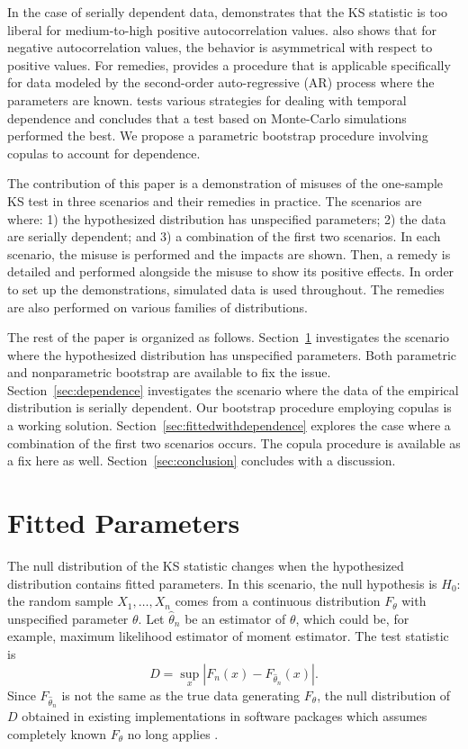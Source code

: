 \documentclass[12pt, letterpaper, titlepage]{article}
\begin{document}
In the case of serially dependent data, \citet{Durilleul} demonstrates that the 
KS statistic is too liberal for medium-to-high positive autocorrelation values. 
\citet{Durilleul} also shows that for negative autocorrelation values, the 
behavior is asymmetrical with respect to positive values. For remedies, 
\citet{Weiss} provides a procedure that is applicable specifically for data 
modeled by the second-order auto-regressive (AR) process where the parameters 
are known. \citet{Lanzante} tests various strategies for dealing with temporal 
dependence and concludes that a test based on Monte-Carlo simulations performed 
the best. We propose a parametric bootstrap procedure involving copulas to 
account for dependence.

The contribution of this paper is a demonstration of misuses of the one-sample
KS test in three scenarios and their remedies in practice. The scenarios are 
where:
1) the hypothesized distribution has unspecified parameters;
2) the data are serially dependent; and
3) a combination of the first two scenarios. 
In each scenario, the misuse is performed and the impacts are shown. Then, a
remedy is detailed and performed alongside the misuse to show its positive 
effects. In order to set up the demonstrations, simulated data is used 
throughout. The remedies are also performed on various families of 
distributions.

The rest of the paper is organized as follows. Section~\ref{sec:fitted}
investigates the scenario where the hypothesized distribution has unspecified
parameters. Both parametric and nonparametric bootstrap are available to fix the
issue. Section~\ref{sec:dependence} investigates the scenario where the data of 
the empirical distribution is serially dependent. Our bootstrap procedure 
employing copulas is a working solution. Section~\ref{sec:fittedwithdependence}
explores the case where a combination of the first two scenarios occurs. The 
copula procedure is available as a fix here as well. 
Section~\ref{sec:conclusion} concludes with a discussion.

\section{Fitted Parameters}
\label{sec:fitted}

The null distribution of the KS statistic changes when the hypothesized
distribution contains fitted parameters. In this scenario, the null hypothesis
is $H_0$: the random sample $X_1, \ldots, X_n$ comes from a continuous
distribution $F_{\theta}$ with unspecified parameter $\theta$.
Let $\hat\theta_n$ be an estimator of $\theta$, which could be, for example,
maximum likelihood estimator of moment estimator. The test statistic is
\begin{equation}
  \label{eq:ks_fitted}
  D = \sup_x | F_n(x) - F_{\hat\theta_n}(x) |.
\end{equation}
Since $F_{\hat\theta_n}$ is not the same as the true data generating
$F_\theta$, the null distribution of $D$ obtained in existing implementations in
software packages which assumes completely known $F_\theta$ no long applies
\citep{Steinskog}.
\end{document}
